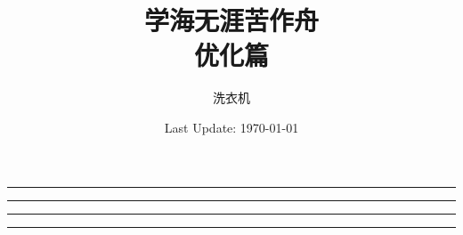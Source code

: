 \newtheorem{property}{性质}[section]
\makeatletter
\renewcommand*{\maketitle}{
	\begin{titlepage}
		\centering
		\vspace*{5\baselineskip}
		
		\rule{\textwidth}{1.6pt}\vspace*{-\baselineskip}\vspace*{2pt}
		\rule{\textwidth}{0.4pt}
		
		\vspace{0.75\baselineskip}
		
		{\LARGE\bfseries \@title}
		
		\vspace{0.75\baselineskip}
		
		\rule{\textwidth}{0.4pt}\vspace*{-\baselineskip}\vspace{3.2pt}
		\rule{\textwidth}{1.6pt}
		
		\vspace{4\baselineskip}
		
		{\Large \@author}
		
		\vspace{0.35\baselineskip}	
		
		{\Large \@date}
		\vfill
	\end{titlepage}
}
\makeatother
\title{学海无涯苦作舟 \\[20pt]
	\Large 优化篇
}
\author{洗衣机}
\date{Last Update: \today}

	\maketitle
	\clearpage
	\tableofcontents  %
    \clearpage
